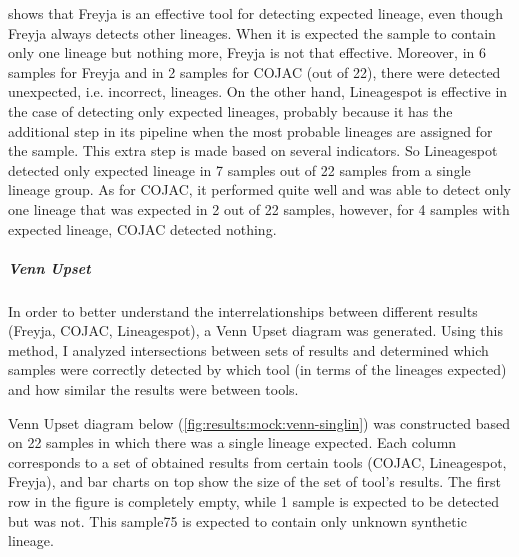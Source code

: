                  shows that Freyja is an effective tool for detecting expected lineage, even though Freyja always detects other lineages. When it is expected the sample to contain only one lineage but nothing more, Freyja is not that effective. Moreover, in 6 samples for Freyja and in 2 samples for COJAC (out of 22), there were detected unexpected, i.e. incorrect, lineages. On the other hand, Lineagespot is effective in the case of detecting only expected lineages, probably because it has the additional step in its pipeline when the most probable lineages are assigned for the sample. This extra step is made based on several indicators. So Lineagespot detected only expected lineage in 7 samples out of 22 samples from a single lineage group. As for COJAC, it performed quite well and was able to detect only one lineage that was expected in 2 out of 22 samples, however, for 4 samples with expected lineage, COJAC detected nothing.
                
                \subparagraph{Venn Upset}
                In order to better understand the interrelationships between different results (Freyja, COJAC, Lineagespot), a Venn Upset diagram was generated. Using this method, I analyzed intersections between sets of results and determined which samples were correctly detected by which tool (in terms of the lineages expected) and how similar the results were between tools.

                Venn Upset diagram below (\cref{fig:results:mock:venn-singlin}) was constructed based on 22 samples in which there was a single lineage expected. Each column corresponds to a set of obtained results from certain tools (COJAC, Lineagespot, Freyja), and bar charts on top show the size of the set of tool’s results. The first row in the figure is completely empty, while 1 sample is expected to be detected but was not. This sample75 is expected to contain only unknown synthetic lineage. 
                
